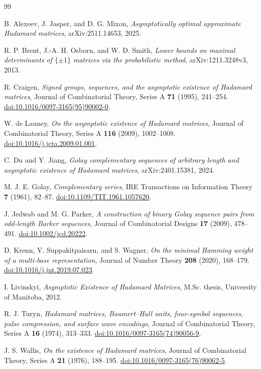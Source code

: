 \documentclass[11pt]{article}
\begin{document}
\begin{thebibliography}{99}

B. Alexeev, J. Jasper, and D. G. Mixon,
\emph{Asymptotically optimal approximate Hadamard matrices},
arXiv:2511.14653, 2025.

R. P. Brent, J.-A. H. Osborn, and W. D. Smith,
\emph{Lower bounds on maximal determinants of $\{\pm1\}$ matrices via the probabilistic method},
arXiv:1211.3248v3, 2013.


R. Craigen,
\emph{Signed groups, sequences, and the asymptotic existence of Hadamard matrices},
Journal of Combinatorial Theory, Series A \textbf{71} (1995), 241--254.
\href{https://doi.org/10.1016/0097-3165(95)90002-0}{doi:10.1016/0097-3165(95)90002-0}.

W. de Launey,
\emph{On the asymptotic existence of Hadamard matrices},
Journal of Combinatorial Theory, Series A \textbf{116} (2009), 1002--1008.
\href{https://doi.org/10.1016/j.jcta.2009.01.001}{doi:10.1016/j.jcta.2009.01.001}.

C. Du and Y. Jiang,
\emph{Golay complementary sequences of arbitrary length and asymptotic existence of Hadamard matrices},
arXiv:2401.15381, 2024.

M. J. E. Golay,
\emph{Complementary series},
IRE Transactions on Information Theory \textbf{7} (1961), 82--87.
\href{https://doi.org/10.1109/TIT.1961.1057620}{doi:10.1109/TIT.1961.1057620}.

J. Jedwab and M. G. Parker,
\emph{A construction of binary Golay sequence pairs from odd-length Barker sequences},
Journal of Combinatorial Designs \textbf{17} (2009), 478--491.
\href{https://doi.org/10.1002/jcd.20222}{doi:10.1002/jcd.20222}.

D. Krenn, V. Suppakitpaisarn, and S. Wagner,
\emph{On the minimal Hamming weight of a multi-base representation},
Journal of Number Theory \textbf{208} (2020), 168--179.
\href{https://doi.org/10.1016/j.jnt.2019.07.023}{doi:10.1016/j.jnt.2019.07.023}.

I. Livinskyi,
\emph{Asymptotic Existence of Hadamard Matrices},
M.Sc. thesis, University of Manitoba, 2012.

R. J. Turyn,
\emph{Hadamard matrices, Baumert--Hall units, four-symbol sequences, pulse compression, and surface wave encodings},
Journal of Combinatorial Theory, Series A \textbf{16} (1974), 313--333.
\href{https://doi.org/10.1016/0097-3165(74)90056-9}{doi:10.1016/0097-3165(74)90056-9}.

J. S. Wallis,
\emph{On the existence of Hadamard matrices},
Journal of Combinatorial Theory, Series A \textbf{21} (1976), 188--195.
\href{https://doi.org/10.1016/0097-3165(76)90062-5}{doi:10.1016/0097-3165(76)90062-5}.

\end{thebibliography}
\end{document}
